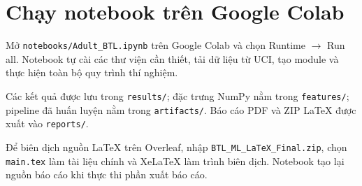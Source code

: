 \section{Chạy notebook trên Google Colab}
\label{sec:A_1}
Mở \texttt{notebooks/Adult\_BTL.ipynb} trên Google Colab và chọn Runtime $\rightarrow$ Run all. Notebook tự cài các thư viện cần thiết, tải dữ liệu từ UCI, tạo module và thực hiện toàn bộ quy trình thí nghiệm.

Các kết quả được lưu trong \texttt{results/}; đặc trưng NumPy nằm trong \texttt{features/}; pipeline đã huấn luyện nằm trong \texttt{artifacts/}. Báo cáo PDF và ZIP LaTeX được xuất vào \texttt{reports/}.

Để biên dịch nguồn LaTeX trên Overleaf, nhập \texttt{BTL\_ML\_LaTeX\_Final.zip}, chọn \texttt{main.tex} làm tài liệu chính và XeLaTeX làm trình biên dịch. Notebook tạo lại nguồn báo cáo khi thực thi phần xuất báo cáo.
